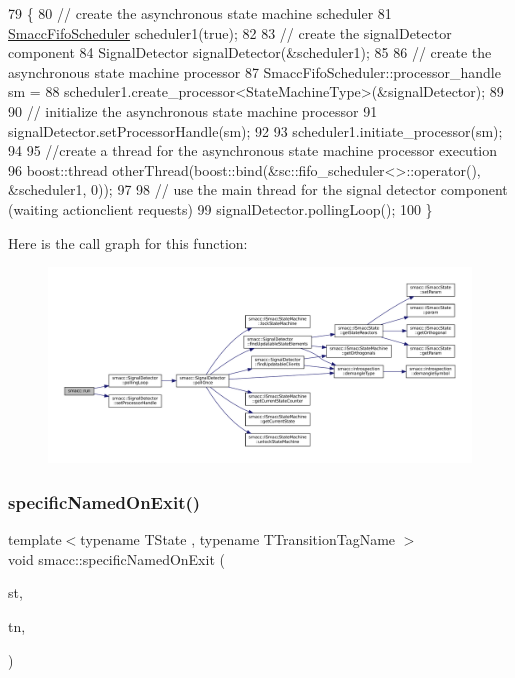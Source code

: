 \begin{DoxyCode}
79 \{
80     \textcolor{comment}{// create the asynchronous state machine scheduler}
81     \hyperlink{smacc__fifo__scheduler_8h_a0063e275231c80d5f97df21d17257bf7}{SmaccFifoScheduler} scheduler1(\textcolor{keyword}{true});
82 
83     \textcolor{comment}{// create the signalDetector component}
84     SignalDetector signalDetector(&scheduler1);
85 
86     \textcolor{comment}{// create the asynchronous state machine processor}
87     SmaccFifoScheduler::processor\_handle sm =
88         scheduler1.create\_processor<StateMachineType>(&signalDetector);
89 
90     \textcolor{comment}{// initialize the asynchronous state machine processor}
91     signalDetector.setProcessorHandle(sm);
92 
93     scheduler1.initiate\_processor(sm);
94 
95     \textcolor{comment}{//create a thread for the asynchronous state machine processor execution}
96     boost::thread otherThread(boost::bind(&sc::fifo\_scheduler<>::operator(), &scheduler1, 0));
97 
98     \textcolor{comment}{// use the  main thread for the signal detector component (waiting actionclient requests)}
99     signalDetector.pollingLoop();
100 \}
\end{DoxyCode}
Here is the call graph for this function\+:
\nopagebreak
\begin{figure}[H]
\begin{center}
\leavevmode
\includegraphics[width=350pt]{namespacesmacc_a47ac3b8d2968b1ba4152afd64ab66bd0_cgraph}
\end{center}
\end{figure}
\mbox{\label{namespacesmacc_afd94fcb8f8c410a0ced7954bf76e845d}} 
\subsubsection{\texorpdfstring{specific\+Named\+On\+Exit()}{specificNamedOnExit()}\hspace{0.1cm}{\footnotesize\ttfamily [1/3]}}
{\footnotesize\ttfamily template$<$typename T\+State , typename T\+Transition\+Tag\+Name $>$ \\
void smacc\+::specific\+Named\+On\+Exit (\begin{DoxyParamCaption}\item[{T\+State \&}]{st,  }\item[{T\+Transition\+Tag\+Name}]{tn,  }\item[{std\+::true\+\_\+type}]{ }\end{DoxyParamCaption})}



